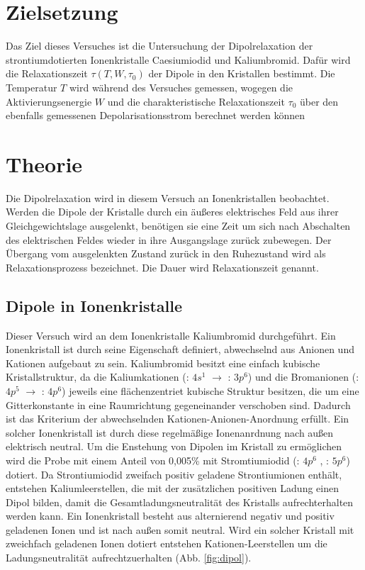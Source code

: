 \section{Zielsetzung}
\label{sec:Zielsetzung}

Das Ziel dieses Versuches ist die Untersuchung der Dipolrelaxation der 
strontiumdotierten Ionenkristalle Caesiumiodid und Kaliumbromid.
Dafür wird die Relaxationszeit $\tau(T,W,\tau_{\text{0}})$ der Dipole in den 
Kristallen bestimmt. Die Temperatur $T$ wird während des Versuches gemessen,
wogegen die Aktivierungsenergie $W$ und die charakteristische Relaxationszeit $\tau_{0}$
über den ebenfalls gemessenen Depolarisationsstrom berechnet werden können

\section{Theorie}
\label{sec:Theorie}

Die Dipolrelaxation wird in diesem Versuch an Ionenkristallen beobachtet.
Werden die Dipole der Kristalle durch ein äußeres elektrisches Feld aus ihrer 
Gleichgewichtslage ausgelenkt, benötigen sie eine Zeit um sich nach Abschalten des 
elektrischen Feldes wieder in ihre Ausgangslage zurück zubewegen. Der Übergang 
vom ausgelenkten Zustand zurück in den Ruhezustand wird als Relaxationsprozess 
bezeichnet. Die Dauer wird Relaxationszeit genannt.

\subsection{Dipole in Ionenkristalle}
\label{sec:Ionenkristalle}

Dieser Versuch wird an dem  Ionenkristalle Kaliumbromid durchgeführt.
Ein Ionenkristall ist durch seine Eigenschaft definiert, abwechselnd aus Anionen
und Kationen aufgebaut zu sein.
Kaliumbromid besitzt eine einfach kubische Kristallstruktur,
da die Kaliumkationen (: $4s^1$ $\to$ : $3p^6$) und die Bromanionen 
(: $4p^5$ $\to$ : $4p^6$)
jeweils eine flächenzentriet kubische Struktur besitzen, die 
um eine Gitterkonstante in eine Raumrichtung gegeneinander verschoben sind.
Dadurch ist das Kriterium der abwechselnden Kationen-Anionen-Anordnung 
erfüllt. Ein solcher Ionenkristall ist durch diese regelmäßige Ionenanrdnung nach außen
elektrisch neutral. Um die Enstehung von Dipolen im Kristall zu ermöglichen wird 
die Probe mit einem Anteil von 0,005\% mit 
Stromtiumiodid (: $4p^6$ , : $5p^6$) dotiert. Da Strontiumiodid zweifach positiv 
geladene Strontiumionen enthält, entstehen Kaliumleerstellen, die mit der 
zusätzlichen positiven Ladung einen Dipol bilden, damit die Gesamtladungsneutralität des
Kristalls aufrechterhalten werden kann. 
Ein Ionenkristall besteht aus alternierend negativ und positiv geladenen Ionen und ist nach außen somit neutral.
Wird ein solcher Kristall mit zweichfach geladenen Ionen dotiert entstehen Kationen-Leerstellen um die Ladungsneutralität aufrechtzuerhalten (Abb. \ref{fig:dipol}). 


